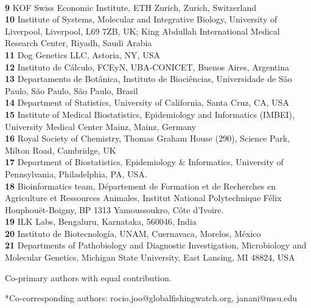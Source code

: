 \documentclass[10pt,letterpaper]{article}
\begin{document}
\begin{flushleft}
\\
\textbf{9} KOF Swiss Economic Institute, ETH Zurich, Zurich, Switzerland
\\
\textbf{10} Institute of Systems, Molecular and Integrative Biology, University of Liverpool, Liverpool, L69 7ZB, UK; King Abdullah International Medical Research Center, Riyadh, Saudi Arabia
\\
\textbf{11} Dog Genetics LLC, Astoria, NY, USA
\\
\textbf{12} Instituto de Cálculo, FCEyN, UBA-CONICET, Buenos Aires, Argentina
\\
\textbf{13} Departamento de Botânica, Instituto de Biociências, Universidade de São Paulo, São Paulo, São Paulo, Brasil
\\
\textbf{14} Department of Statistics, University of California, Santa Cruz, CA, USA
\\
\textbf{15} Institute of Medical Biostatistics, Epidemiology and Informatics (IMBEI), University Medical Center Mainz, Mainz, Germany
\\
\textbf{16} Royal Society of Chemistry, Thomas Graham House (290), Science Park, Milton Road, Cambridge, UK
\\
\textbf{17} Department of Biostatistics, Epidemiology \& Informatics, University of Pennsylvania, Philadelphia, PA, USA.
\\
\textbf{18} Bioinformatics team, Département de Formation et de Recherches en Agriculture et Ressources Animales, Institut National Polytechnique Félix Houphouët-Boigny, BP 1313 Yamoussoukro, Côte d’Ivoire.
\\
\textbf{19} ILK Labs, Bengaluru, Karnataka, 560046, India
\\
\textbf{20} Instituto de Biotecnología, UNAM, Cuernavaca, Morelos, México
\\
\textbf{21} Departments of Pathobiology and Diagnostic Investigation, Microbiology and Molecular Genetics, Michigan State University, East Lansing, MI 48824, USA
\\
\bigskip

% 
%
\Yinyang Co-primary authors with equal contribution.




*Co-corresponding authors: rocio.joo@globalfishingwatch.org, janani@msu.edu

\end{flushleft}
\end{document}
